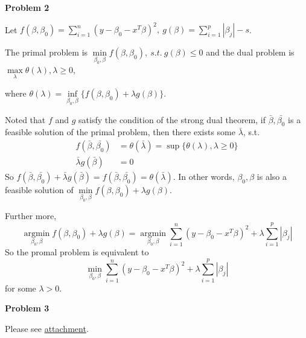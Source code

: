 \documentclass[UTF8,12pt]{article}
\newenvironment{problem}[2][Problem]
{ \begin{mdframed}[backgroundcolor=gray!20] \textbf{#1 #2}}
	{  \end{mdframed}}
\newenvironment{answer}
{%
}
{}
\newenvironment{eq}
{
	\begin{equation}
		\begin{aligned}\nonumber
}
{
		\end{aligned}
	\end{equation}
}
\begin{document}
\begin{problem}{2}
\end{problem}
\begin{answer}
	Let $f(\beta,\beta_0)=\sum_{i=1}^n (y-\beta_0-x^T\beta)^2,
	\ g(\beta)=\sum_{i=1}^p|\beta_j|-s$.
	
	The primal problem is $\min\limits_{\beta_0,\beta}f(\beta,\beta_0),
	\ s.t.\ g(\beta)\le 0$ and the dual problem is $\max\limits_{\lambda}
	\theta(\lambda),\lambda\ge 0$,

	where $\theta(\lambda)=\inf\limits_{\beta_0,\beta}
	{\{f(\beta,\beta_0)+\lambda g(\beta)\}}$.

	Noted that $f$ and $g$ satisfy the condition of the strong dual theorem, 
	if $\bar{\beta}, \bar{\beta_0}$ is a feasible solution of the primal problem, then there
	exists some $\bar{\lambda}$, s.t.
	\begin{eq}
		f(\bar{\beta},\bar{\beta_0})&=\theta(\bar{\lambda})=\sup{\{\theta(\lambda),
		\lambda\ge 0\}}\\
		\bar{\lambda}g(\bar{\beta})&=0
	\end{eq}
	So $f(\bar{\beta},\bar{\beta_0})+\bar{\lambda} g(\bar{\beta})
	=f(\bar{\beta},\bar{\beta_0})
	=\theta(\bar{\lambda})$. In other words, $\beta_0,\beta$ is also a feasible solution
	of $\min\limits_{\beta_0,\beta}{f(\beta,\beta_0)+\lambda g(\beta)}$.

	Further more,
	$$
	\mathop{argmin}\limits_{\beta_0,\beta} f(\beta,\beta_0)+\lambda g(\beta)
	= \mathop{argmin}\limits_{\beta_0,\beta} \sum_{i=1}^n (y-\beta_0-x^T\beta)^2
	+\lambda\sum_{i=1}^p|\beta_j|
	$$	
	So the promal problem is equivalent to $$\min\limits_{\beta_0,\beta}
	\sum_{i=1}^n (y-\beta_0-x^T\beta)^2
	+\lambda\sum_{i=1}^p|\beta_j|$$ for some $\lambda > 0$.
\end{answer}

\begin{problem}{3}
\end{problem}
\begin{answer}
	Please see \href{hw6Ex3.rmd}{attachment}.
\end{answer}
\end{document}
